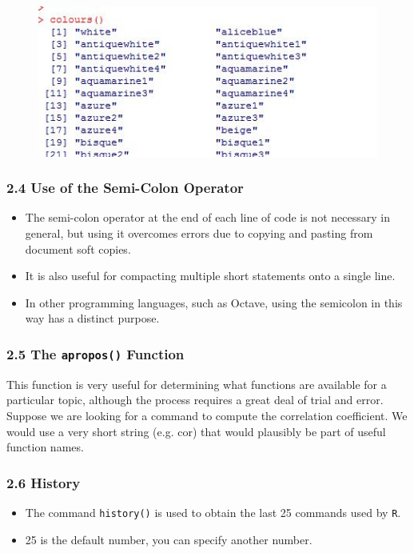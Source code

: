 \documentclass{beamer}
\begin{document}
 \begin{frame}
 	\begin{figure}
 		\centering
 		\includegraphics[width=0.7\linewidth]{images/Rcolours}
 		\caption{}
 		\label{fig:Rcolours}
 	\end{figure}
 	
 \end{frame}
 \begin{frame}
 	\frametitle{2.4 Use of the Semi-Colon Operator}
 	\begin{itemize}
 		\item The semi-colon operator at the end of each line of code is not necessary in general, but using it
 		overcomes errors due to copying and pasting from document soft copies. 
 		\item It is also useful for compacting multiple short statements onto a single line.
 		\item In other programming
 		languages, such as Octave, using the semicolon in this way has a distinct purpose.
 	\end{itemize}
 \end{frame}
 \begin{frame}
 	\frametitle{2.5 The \texttt{apropos()} Function}
 	This function is very useful for determining what functions are available for a particular topic,
 	although the process requires a great deal of trial and error. Suppose we are looking for a
 	command to compute the correlation coefficient. We would use a very short string (e.g. cor)
 	that would plausibly be part of useful function names.
 	
 \end{frame}
 \begin{frame}
 	\frametitle{2.6 History}
 	\begin{itemize}
 		\item The command \texttt{history()} is used to obtain the last 25 commands used by \texttt{R}.
 		\item 25 is the default number, you can specify another number.
 	\end{itemize}
 	
 	
 \end{frame}
\end{document}
